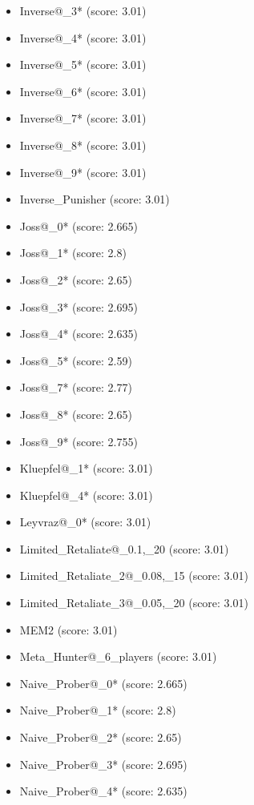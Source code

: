 \begin{appendices}
\begin{itemize}
\begin{multicols}{3}
\begin{itemize}
            \item Inverse@\_3* (score: 3.01)
            \item Inverse@\_4* (score: 3.01)
            \item Inverse@\_5* (score: 3.01)
            \item Inverse@\_6* (score: 3.01)
            \item Inverse@\_7* (score: 3.01)
            \item Inverse@\_8* (score: 3.01)
            \item Inverse@\_9* (score: 3.01)
            \item Inverse\_Punisher (score: 3.01)
            \item Joss@\_0* (score: 2.665)
            \item Joss@\_1* (score: 2.8)
            \item Joss@\_2* (score: 2.65)
            \item Joss@\_3* (score: 2.695)
            \item Joss@\_4* (score: 2.635)
            \item Joss@\_5* (score: 2.59)
            \item Joss@\_7* (score: 2.77)
            \item Joss@\_8* (score: 2.65)
            \item Joss@\_9* (score: 2.755)
            \item Kluepfel@\_1* (score: 3.01)
            \item Kluepfel@\_4* (score: 3.01)
            \item Leyvraz@\_0* (score: 3.01)
            \item Limited\_Retaliate@\_0.1,\_20 (score: 3.01)
            \item Limited\_Retaliate\_2@\_0.08,\_15 (score: 3.01)
            \item Limited\_Retaliate\_3@\_0.05,\_20 (score: 3.01)
            \item MEM2 (score: 3.01)
            \item Meta\_Hunter@\_6\_players (score: 3.01)
            \item Naive\_Prober@\_0* (score: 2.665)
            \item Naive\_Prober@\_1* (score: 2.8)
            \item Naive\_Prober@\_2* (score: 2.65)
            \item Naive\_Prober@\_3* (score: 2.695)
            \item Naive\_Prober@\_4* (score: 2.635)

\end{itemize}
\end{multicols}
\end{itemize}
\end{appendices}
